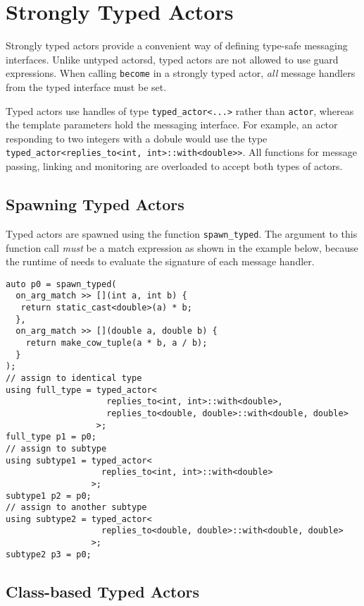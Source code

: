 \section{Strongly Typed Actors}

Strongly typed actors provide a convenient way of defining type-safe messaging interfaces.
Unlike untyped actorsd, typed actors are not allowed to use guard expressions.
When calling \lstinline^become^ in a strongly typed actor, \emph{all} message handlers from the typed interface must be set.

Typed actors use handles of type \lstinline^typed_actor<...>^ rather than \lstinline^actor^, whereas the template parameters hold the messaging interface.
For example, an actor responding to two integers with a dobule would use the type \lstinline^typed_actor<replies_to<int, int>::with<double>>^.
All functions for message passing, linking and monitoring are overloaded to accept both types of actors.

\subsection{Spawning Typed Actors}
\label{sec:strong:spawn}

Typed actors are spawned using the function \lstinline^spawn_typed^.
The argument to this function call \emph{must} be a match expression as shown in the example below, because the runtime of \lib needs to evaluate the signature of each message handler.

\begin{lstlisting}
auto p0 = spawn_typed(
  on_arg_match >> [](int a, int b) {
   return static_cast<double>(a) * b;
  },
  on_arg_match >> [](double a, double b) {
    return make_cow_tuple(a * b, a / b);
  }
);
// assign to identical type
using full_type = typed_actor<
                    replies_to<int, int>::with<double>,
                    replies_to<double, double>::with<double, double>
                  >;
full_type p1 = p0;
// assign to subtype
using subtype1 = typed_actor<
                   replies_to<int, int>::with<double>
                 >;
subtype1 p2 = p0;
// assign to another subtype
using subtype2 = typed_actor<
                   replies_to<double, double>::with<double, double>
                 >;
subtype2 p3 = p0;
\end{lstlisting}

\clearpage
\subsection{Class-based Typed Actors}

